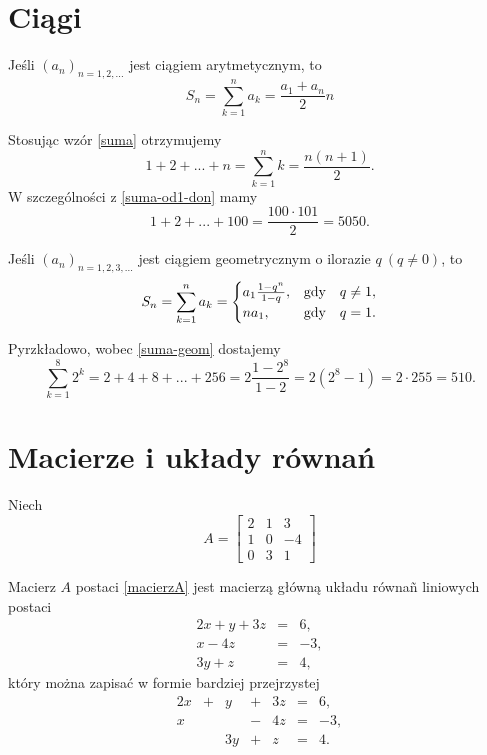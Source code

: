 \documentclass[12 pt, leqno]{article}
\author{Konrad Pagacz}
\begin{document}
\section{Ciągi}
Jeśli $(a_n)_{n=1,2,...}$ jest ciągiem arytmetycznym, to
\begin{equation}
S_n = \sum\limits_{k=1}^{n}a_k=\frac{a_1 + a_n}{2}n \label{suma}
\end{equation}

Stosując wzór \eqref{suma} otrzymujemy
\begin{equation}
1 + 2 + ... + n = \sum\limits_{k=1}^{n}k = \frac{n(n+1)}{2}. \label{suma-od1-don}
\end{equation}
W szczególności z \eqref{suma-od1-don} mamy
\begin{equation*}
1 + 2 + ... + 100 = \frac{100\cdot 101}{2} = 5050.
\end{equation*}

Jeśli $(a_n)_{n=1,2,3,...}$ jest ciągiem geometrycznym o ilorazie $q \ (q\neq 0)$, to
\begin{equation}
S_n=\sum\limits_{k=1}^{n}a_k=
\begin{cases}
a_1\frac{1-q^n}{1-q}, & \textnormal{gdy} \quad q\neq 1, \\
na_1, & \mbox{gdy} \quad q=1.
\end{cases} \label{suma-geom}
\end{equation}

Pyrzkładowo, wobec \eqref{suma-geom} dostajemy
\begin{equation*}
\sum\limits_{k=1}^{8}2^k=2+4+8+...+256=2\frac{1-2^8}{1-2}=2(2^8-1)=2\cdot 255=510.
\end{equation*}

\section{Macierze i układy równań}
Niech
\begin{equation}
A=\left[
\begin{array}{rrr}
2	&	1	&	3 \\
1	&	0	&	-4 \\
0	&	3	&	1
\end{array}
\right]
\label{macierzA}
\end{equation}

Macierz $A$ postaci \eqref{macierzA} jest macierzą główną układu równañ liniowych postaci
\begin{eqnarray*}
2x+y+3z	&	=	&	6, \\
x - 4z	&	=	&	-3, \\
3y + z	&	=	&	4,
\end{eqnarray*}
który można zapisać w formie bardziej przejrzystej
\begin{equation}
\begin{array}{rrrrrrr}
2x & + & y & + & 3z & = & 6 , \\
x &  &  & - & 4z & = & -3 , \\
 &  & 3y & + & z & = & 4 . 
\end{array}
\label{array-form}
\end{equation}
\end{document}
